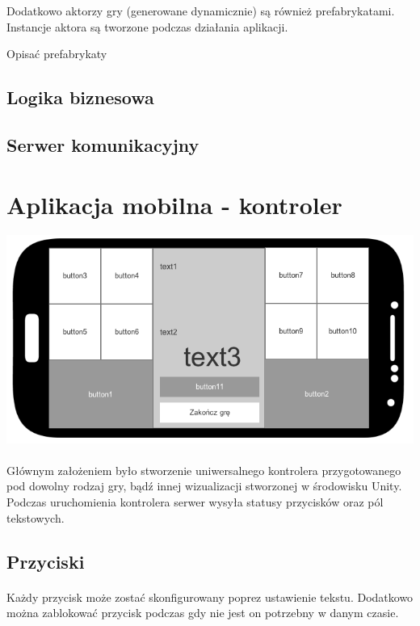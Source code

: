 \documentclass[12pt]{article}
\begin{document}
{{Dodatkowo aktorzy gry (generowane dynamicznie) są również prefabrykatami. Instancje aktora są tworzone podczas działania aplikacji.

{\color{red}Opisać prefabrykaty}

\subsection{Logika biznesowa}
\subsection{Serwer komunikacyjny}
\newpage
\section{Aplikacja mobilna - kontroler}

\begin{center}
\includegraphics[width=1\textwidth]{images/button_mockup.png}
\end{center}
\paragraph{}
Głównym założeniem było stworzenie uniwersalnego kontrolera przygotowanego pod dowolny rodzaj gry, bądź innej wizualizacji stworzonej w środowisku Unity. Podczas uruchomienia kontrolera serwer wysyła statusy przycisków oraz pól tekstowych.

\subsection{Przyciski}
\paragraph{}
Każdy przycisk może zostać skonfigurowany poprez ustawienie tekstu. Dodatkowo można zablokować przycisk podczas gdy nie jest on potrzebny w danym czasie.
}}
\end{document}
